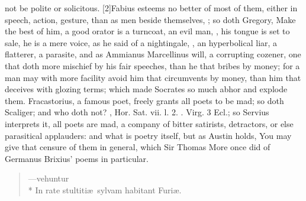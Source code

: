{not be polite or solicitous. [2\baselineskip]Fabius esteems no better of most of
them, either in speech, action, gesture, than as men beside themselves,
; so doth Gregory,  Make the best of him, a good orator is a turncoat, an
evil man, , his tongue is set to sale, he is a
mere voice, as he said of a nightingale, , an
hyperbolical liar, a flatterer, a parasite, and as  Ammianus
Marcellinus will, a corrupting cozener, one that doth more mischief by
his fair speeches, than he that bribes by money; for a man may with
more facility avoid him that circumvents by money, than him that
deceives with glozing terms; which made Socrates so much abhor and
explode them. Fracastorius, a famous poet, freely grants all poets
to be mad; so doth Scaliger; and who doth not? , Hor. Sat. vii. l. 2.
. Virg. 3 Ecl.; so Servius
interprets it, all poets are mad, a company of bitter satirists,
detractors, or else parasitical applauders: and what is poetry itself,
but as Austin holds,  You
may give that censure of them in general, which Sir Thomas More once
did of Germanus Brixius' poems in particular.

\begin{verse}
---\textlatin{vehuntur}\\*
\textlatin{In rate stultiti\ae{}\ sylvam habitant Furi\ae{}.}
\end{verse}

}

